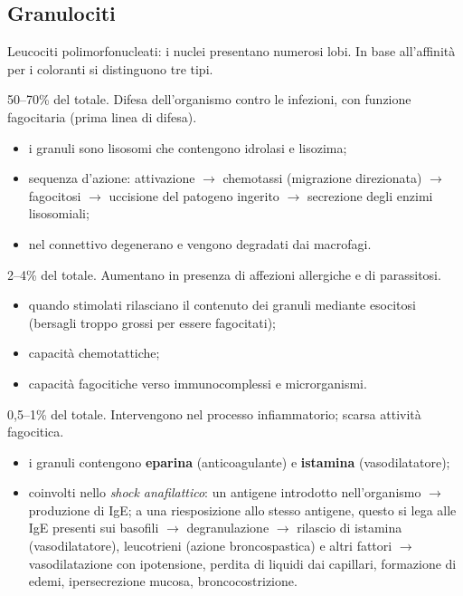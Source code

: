 \subsection{Granulociti}

Leucociti polimorfonucleati: i nuclei presentano numerosi lobi. In base all'affinità per i coloranti si distinguono tre tipi.

50--70\% del totale. Difesa dell'organismo contro le infezioni, con funzione fagocitaria (prima linea di difesa).
\begin{itemize}
  \item i granuli sono lisosomi che contengono idrolasi e lisozima;
  \item sequenza d'azione: attivazione $\rightarrow$ chemotassi (migrazione direzionata) $\rightarrow$ fagocitosi $\rightarrow$ uccisione del patogeno ingerito $\rightarrow$ secrezione degli enzimi lisosomiali;
  \item nel connettivo degenerano e vengono degradati dai macrofagi.
\end{itemize}

2--4\% del totale. Aumentano in presenza di affezioni allergiche e di parassitosi.
\begin{itemize}
  \item quando stimolati rilasciano il contenuto dei granuli mediante esocitosi (bersagli troppo grossi per essere fagocitati);
  \item capacità chemotattiche;
  \item capacità fagocitiche verso immunocomplessi e microrganismi.
\end{itemize}

0,5--1\% del totale. Intervengono nel processo infiammatorio; scarsa attività fagocitica.
\begin{itemize}
  \item i granuli contengono \textbf{eparina} (anticoagulante) e \textbf{istamina} (vasodilatatore);
  \item coinvolti nello \textit{shock anafilattico}: un antigene introdotto nell'organismo $\rightarrow$ produzione di IgE; a una riesposizione allo stesso antigene, questo si lega alle IgE presenti sui basofili $\rightarrow$ degranulazione $\rightarrow$ rilascio di istamina (vasodilatatore), leucotrieni (azione broncospastica) e altri fattori $\rightarrow$ vasodilatazione con ipotensione, perdita di liquidi dai capillari, formazione di edemi, ipersecrezione mucosa, broncocostrizione.
\end{itemize}

